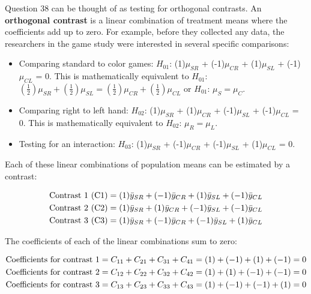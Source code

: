 \documentclass[
]{report}
\providecommand{\tightlist}{%
  \setlength{\itemsep}{0pt}\setlength{\parskip}{0pt}}
\begin{document}
Question 38 can be thought of as testing for orthogonal contrasts. An \textbf{orthogonal contrast} is a linear combination of treatment means where the coefficients add up to zero. For example, before they collected any data, the researchers in the game study were interested in several specific comparisons:

\begin{itemize}
\tightlist
\item
  Comparing standard to color games: \(H_{01}\): (1)\(\mu_{SR}\) + (-1)\(\mu_{CR}\) + (1)\(\mu_{SL}\) + (-1)\(\mu_{CL}\) = 0. This is mathematically equivalent to \(H_{01}\): \((\frac{1}{2})\mu_{SR} + (\frac{1}{2})\mu_{SL} = (\frac{1}{2})\mu_{CR} + (\frac{1}{2})\mu_{CL}\) or \(H_{01}\): \(\mu_{S} = \mu_{C}\).
\item
  Comparing right to left hand: \(H_{02}\): (1)\(\mu_{SR}\) + (1)\(\mu_{CR}\) + (-1)\(\mu_{SL}\) + (-1)\(\mu_{CL}\) = 0. This is mathematically equivalent to \(H_{02}\): \(\mu_{R} = \mu_{L}\).
\item
  Testing for an interaction: \(H_{03}\): (1)\(\mu_{SR}\) + (-1)\(\mu_{CR}\) + (-1)\(\mu_{SL}\) + (1)\(\mu_{CL}\) = 0.
\end{itemize}

Each of these linear combinations of population means can be estimated by a contrast:

\begin{align}
\text{Contrast 1 (C1)} &= (1)\bar{y}_{SR} + (-1)\bar{y}_{CR} + (1)\bar{y}_{SL} + (-1)\bar{y}_{CL} \notag \\
\text{Contrast 2 (C2)} &= (1)\bar{y}_{SR} + (1)\bar{y}_{CR} + (-1)\bar{y}_{SL} + (-1)\bar{y}_{CL} \notag \\
\text{Contrast 3 (C3)} &= (1)\bar{y}_{SR} + (-1)\bar{y}_{CR} + (-1)\bar{y}_{SL} + (1)\bar{y}_{CL} 
\notag
\end{align}

The coefficients of each of the linear combinations sum to zero:

\begin{align}
\text{Coefficients for contrast 1} &= C_{11} + C_{21} + C_{31} + C_{41} = (1) + (-1) + (1) + (-1) = 0 \notag \\
\text{Coefficients for contrast 2} &= C_{12} + C_{22} + C_{32} + C_{42} = (1) + (1) + (-1) + (-1) = 0 \notag \\
\text{Coefficients for contrast 3} &= C_{13} + C_{23} + C_{33} + C_{43} = (1) + (-1) + (-1) + (1) = 0 
\notag
\end{align}
\end{document}
